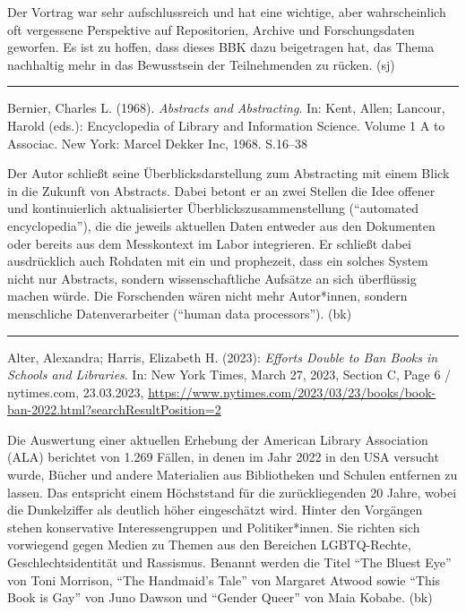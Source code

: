 \documentclass[a4paper,
fontsize=11pt,
oneside,
numbers=noperiodatend,
parskip=half-,
bibliography=totoc,
final
]{scrartcl}
\begin{document}
Der Vortrag war sehr aufschlussreich und hat eine wichtige, aber
wahrscheinlich oft vergessene Perspektive auf Repositorien, Archive und
Forschungsdaten geworfen. Es ist zu hoffen, dass dieses BBK dazu
beigetragen hat, das Thema nachhaltig mehr in das Bewusstsein der
Teilnehmenden zu rücken. (sj)

\begin{center}\rule{0.5\linewidth}{0.5pt}\end{center}

Bernier, Charles L. (1968). \emph{Abstracts and Abstracting}. In: Kent,
Allen; Lancour, Harold (eds.): Encyclopedia of Library and Information
Science. Volume 1 A to Associac. New York: Marcel Dekker Inc, 1968.
S.16--38

Der Autor schließt seine Überblicksdarstellung zum Abstracting mit einem
Blick in die Zukunft von Abstracts. Dabei betont er an zwei Stellen die
Idee offener und kontinuierlich aktualisierter
Überblickszusammenstellung (\enquote{automated encyclopedia}), die die
jeweils aktuellen Daten entweder aus den Dokumenten oder bereits aus dem
Messkontext im Labor integrieren. Er schließt dabei ausdrücklich auch
Rohdaten mit ein und prophezeit, dass ein solches System nicht nur
Abstracts, sondern wissenschaftliche Aufsätze an sich überflüssig machen
würde. Die Forschenden wären nicht mehr Autor*innen, sondern menschliche
Datenverarbeiter (\enquote{human data processors}). (bk)

\begin{center}\rule{0.5\linewidth}{0.5pt}\end{center}

Alter, Alexandra; Harris, Elizabeth H. (2023): \emph{Efforts Double to
Ban Books in Schools and Libraries}. In: New York Times, March 27, 2023,
Section C, Page 6 / nytimes.com, 23.03.2023,
\url{https://www.nytimes.com/2023/03/23/books/book-ban-2022.html?searchResultPosition=2}

Die Auswertung einer aktuellen Erhebung der American Library Association
(ALA) berichtet von 1.269 Fällen, in denen im Jahr 2022 in den USA
versucht wurde, Bücher und andere Materialien aus Bibliotheken und
Schulen entfernen zu lassen. Das entspricht einem Höchststand für die
zurückliegenden 20 Jahre, wobei die Dunkelziffer als deutlich höher
eingeschätzt wird. Hinter den Vorgängen stehen konservative
Interessengruppen und Politiker*innen. Sie richten sich vorwiegend gegen
Medien zu Themen aus den Bereichen LGBTQ-Rechte, Geschlechtsidentität
und Rassismus. Benannt werden die Titel \enquote{The Bluest Eye} von
Toni Morrison, \enquote{The Handmaid's Tale} von Margaret Atwood sowie
\enquote{This Book is Gay} von Juno Dawson und \enquote{Gender Queer}
von Maia Kobabe. (bk)
\end{document}
